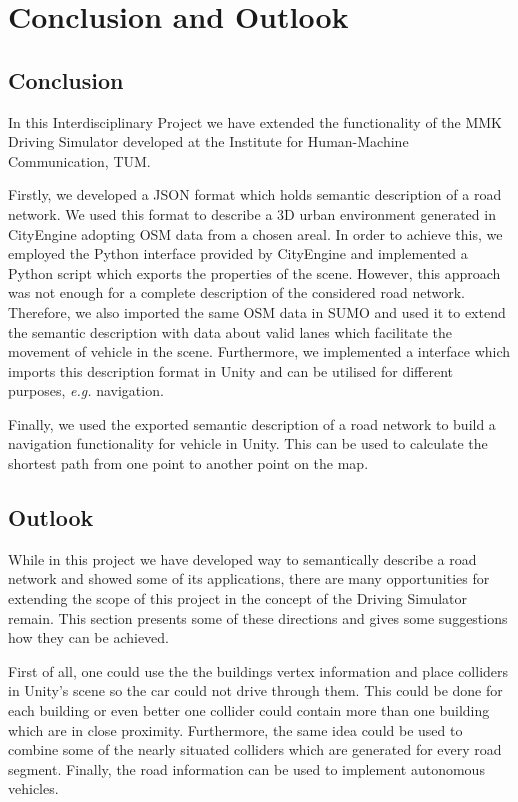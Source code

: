 \chapter{Conclusion and Outlook}
\label{ch:conclusion}

\section{Conclusion}
In this Interdisciplinary Project we have extended the functionality of the MMK Driving Simulator developed at the Institute for Human-Machine Communication, TUM.

Firstly, we developed a JSON format which holds semantic description of a road network. We used this format to describe a 3D urban environment generated in CityEngine adopting OSM data from a chosen areal. In order to achieve this, we employed the Python interface provided by CityEngine and implemented a Python script which exports the properties of the scene. However, this approach was not enough for a complete description of the considered road network. Therefore, we also imported the same OSM data in SUMO and used it to extend the semantic description with data about valid lanes which facilitate the movement of vehicle in the scene. Furthermore, we implemented a interface which imports this description format in Unity and can be utilised for different purposes, \emph{e.g.} navigation. 

Finally, we used the exported semantic description of a road network to  build a navigation functionality for vehicle in Unity. This can be used to calculate the shortest path from one point to another point on the map.

\section{Outlook}

While in this project we have developed way to semantically describe a road network and showed some of its applications, there are many opportunities for extending the scope of this project in the concept of the Driving Simulator remain. This section presents some of these directions and gives some suggestions how they can be achieved. 

First of all, one could use the the buildings vertex information and place colliders in Unity's scene so the car could not drive through them. This could be done for each building or even better one collider could contain more than one building which are in close proximity. Furthermore, the same idea could be used to combine some of the nearly situated colliders which are generated for every road segment. Finally, the road information can be used to implement autonomous vehicles. 
